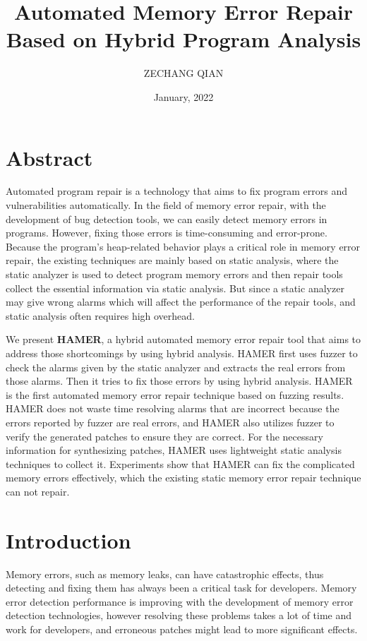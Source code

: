 \documentclass[a4paper,11pt,oneside,openany]{book}
\title{Automated Memory Error Repair\\Based on Hybrid Program Analysis}
\author{ZECHANG QIAN}
\affiliation{%
  Graduate Major in Computer Science\\
  School of Computing\\
  Tokyo Institute of Technology}
\date{January, 2022}
\begin{document}
\frontmatter
\maketitle

\chapter{Abstract}
Automated program repair is a technology that aims to fix program errors and vulnerabilities automatically. In the field of memory error repair, with the development of bug detection tools, we can easily detect memory errors in programs. However, fixing those errors is time-consuming and error-prone. Because the program's heap-related behavior plays a critical role in memory error repair, the existing techniques are mainly based on static analysis, where the static analyzer is used to detect program memory errors and then repair tools collect the essential information via static analysis. But since a static analyzer may give wrong alarms which will affect the performance of the repair tools, and static analysis often requires high overhead. 

We present \textbf{HAMER}, a hybrid automated memory error repair tool that aims to address those 
shortcomings by using hybrid analysis. HAMER first uses fuzzer to check the alarms given by the static 
analyzer and extracts the real errors from those alarms. Then it tries to fix those errors by using 
hybrid analysis. HAMER is the first automated memory error repair technique based on fuzzing results. HAMER does not waste time resolving alarms that are incorrect because the errors reported by fuzzer are real errors, and HAMER also utilizes fuzzer to verify the generated patches to ensure they are correct. For the necessary information for synthesizing patches, HAMER uses lightweight static analysis techniques to collect it. Experiments show that HAMER can fix the complicated memory errors effectively, which the existing static memory error repair technique can not repair.


\tableofcontents
\listoffigures
\listoftables


\mainmatter
\chapter{Introduction}
Memory errors, such as memory leaks, can have catastrophic effects,  thus detecting and fixing them has always been a critical task for developers. Memory error detection performance is improving with the development of memory error detection technologies, however resolving these problems takes a lot of time and work for developers, and erroneous patches might lead to more significant effects.
\end{document}

